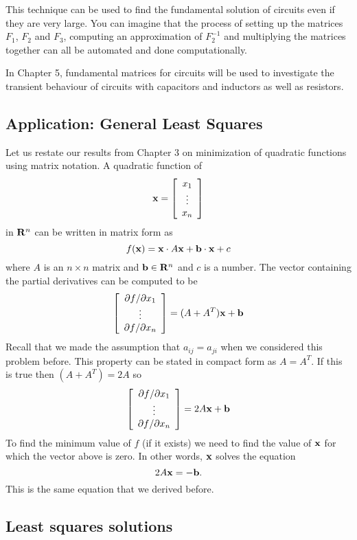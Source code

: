This technique can be used to find the fundamental solution of circuits even if they 
are very large. You can imagine that the process of setting up the 
matrices $F_1$, $F_2$ and $F_3$, computing an approximation of $F_2^{-1}$ and 
multiplying the matrices together can all be automated and done computationally. 

In Chapter 5, fundamental matrices for circuits will be used to investigate the transient 
behaviour of circuits with capacitors and inductors as well as resistors. 


\subsection{Application: General Least Squares}

Let us restate our results from Chapter 3 on minimization of quadratic functions
using matrix notation. A quadratic function of 
\[
{\bf x} = \left[ \begin{array}{c} x_1 \\ \vdots \\ x_n \end{array} \right]
\]
in ${\bf R}^n$ can be written in matrix form as
\[
f({\bf x}) = {\bf x} \cdot A{\bf x} + {\bf b}\cdot{\bf x} + c
\]
where $A$ is an $n\times n$ matrix and ${\bf b}\in{\bf R}^n$ and $c$ is a number.
The vector containing the partial derivatives can be computed to be
\[
\left[ \begin{array}{c} {\partial f}/{\partial x_1} \\ \vdots \\ 
   {\partial f}/{\partial x_n} \end{array} \right]
= (A + A^T){\bf x} +{\bf b}
\]
Recall that we made the assumption that $a_{ij}=a_{ji}$ when we considered
this problem before. This property can be stated in compact form as 
$A=A^T$. If this is true then $(A + A^T)=2A$ so
\[
\left[ \begin{array}{c} {\partial f}/{\partial x_1} \\ \vdots \\ 
   {\partial f}/{\partial x_n} \end{array} \right]
= 2A{\bf x} +{\bf b}
\]
To find the minimum value of $f$ (if it exists) we need to find
the value of ${\bf x}$ for which the vector above is zero. In other words,
${\bf x}$ solves the equation
\[
2A{\bf x} = -{\bf b}.
\]
This is the same equation that we derived before.

\subsection{Least squares solutions}

